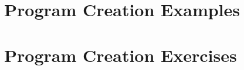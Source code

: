 


\clearpage
\section{Program Creation Examples} %
\label{sec:program_creation_examples}




\clearpage
\section{Program Creation Exercises} %
\label{sec:program_creation_exercises}


